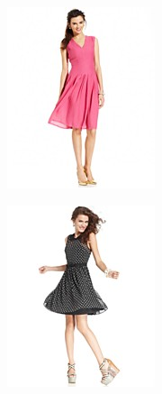\documentclass[11pt]{article}
\begin{document}
\begin{figure}
\centering
\begin{subfigure}{.18\textwidth}
\centering
\includegraphics[width=\linewidth]{concepts/concept2_neg1.jpg}
\label{fig:sub1}
\end{subfigure}%
\begin{subfigure}{.18\textwidth}
\centering
\includegraphics[width=\linewidth]{concepts/concept2_neg2.jpg}

\end{subfigure}
\end{figure}
\end{document}
